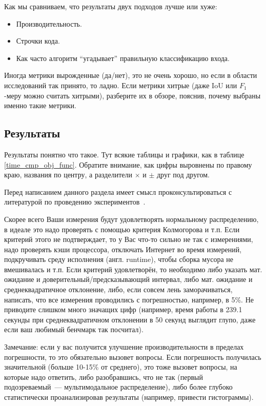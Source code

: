 Как мы сравниваем, что результаты двух подходов лучше или хуже:
\begin{itemize}
    \item Производительность.
    \item Строчки кода.
    \item Как часто алгоритм \enquote{угадывает} правильную класси\-фикацию входа.
\end{itemize}

\noindent Иногда метрики вырожденные (да/нет), это не очень хорошо, но если в области исследований так принято, то ладно.
Если метрики хитрые (даже IoU или $F_1$-меру можно считать хитрыми), разберите их в обзоре, пояснив, почему выбраны именно такие метрики.

\subsection{Результаты}

Результаты понятно что такое.
Тут всякие таблицы и графики, как в таблице \ref{time_cmp_obj_func}.
Обратите внимание, как цифры выровнены по правому краю, названия по центру, а разделители $\times$ и $\pm$ друг под другом.

Перед написанием данного раздела имеет смысл проконсультироваться с литературой по проведению экспериментов~\cite{SmirnovCheatsheet}.

Скорее всего Ваши измерения будут удовлетворять нормальному распределению, в идеале это надо проверять с помощью критерия Кол\-могорова и т.п.
Если критерий этого не подтверждает, то у Вас что-то сильно не так с измерениями, надо проверять кэши процессора, отключать Интернет во время измерений, подкручивать среду исполне\-ния (англ. runtime), что\-бы сборка мусора не вмешивалась и т.п.
Если критерий удовлетворён, то необходимо либо указать мат. ожидание и доверительный/предсказы\-вающий интервал, либо мат. ожидание и среднеквадратичное отклонение, либо, если совсем лень заморачиваться, написать, что все измерения проводились с погрешностью, например, в 5\%.
Не приводите слишком много значащих цифр (например, время работы в 239.1 секунды при среднеквадратичном отклонении в 50 секунд выглядит глупо, даже если ваш любимый бенчмарк так посчитал).

Замечание: если у вас получится улуч\-шение производительности в пределах погреш\-ности, то это обязательно вызовет вопросы.
Если погрешность получилась значительной (больше 10-15\% от среднего), это тоже вызовет вопросы, на которые надо ответить, либо разобравшись, что не так (первый подозреваемый~--- мультимодальное распределение), либо более глубоко статистически проанализировав результаты (например, привести гистограммы).

